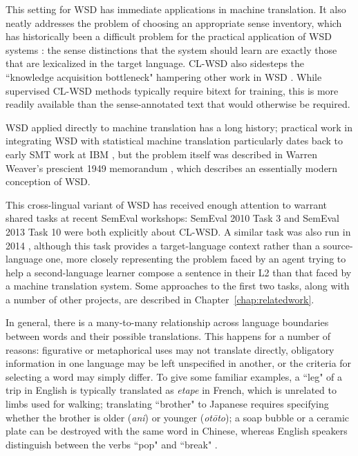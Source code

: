 This setting for WSD has immediate applications in machine translation. It
also neatly addresses the problem of choosing an appropriate sense inventory,
which has historically been a difficult problem for the practical application
of WSD systems \cite{agirre2006word}: the sense distinctions that the system
should learn are exactly those that are lexicalized in the target language.
CL-WSD also sidesteps the ``knowledge acquisition bottleneck" hampering other
work in WSD \cite{lefever-hoste-decock:2011:ACL-HLT2011}.
While supervised CL-WSD methods typically require bitext for training, this is
more readily available than the sense-annotated text that would otherwise be
required.

WSD applied directly to machine translation has a long history; practical work
in integrating WSD with statistical machine translation particularly dates back
to early SMT work at IBM \cite{Brown91word-sensedisambiguation}, but the
problem itself was described in Warren Weaver's prescient 1949 memorandum
\cite{weavermemo}, which describes an essentially modern conception of WSD.

This cross-lingual variant of WSD has received enough attention to warrant
shared tasks at recent SemEval workshops: SemEval 2010 Task 3
\cite{lefever-hoste:2010:SemEval} and SemEval 2013 Task 10 \cite{task10} were both
explicitly about CL-WSD.  A similar task was also run in 2014
\cite{vangompel-EtAl:2014:SemEval}, although this task provides a
target-language context rather than a source-language one, more closely
representing the problem faced by an agent trying to help a second-language
learner compose a sentence in their L2 than that faced by a machine translation
system. Some approaches to the first two tasks, along with a number of other
projects, are described in Chapter~\ref{chap:relatedwork}.

In general, there is a many-to-many relationship across language boundaries
between words and their possible translations.
This happens for a number of reasons: figurative or metaphorical uses may not
translate directly,
obligatory information in one language may be left unspecified in another,
or the criteria for selecting a word may simply differ.
To give some familiar examples, a ``leg" of a trip in English is typically
translated as \emph{etape} in French, which is unrelated to limbs used for
walking;
translating ``brother" to Japanese requires specifying whether the brother is
older (\emph{ani}) or younger (\emph{ot\=oto});
a soap bubble or a ceramic plate can be destroyed with the same word in
Chinese, whereas English speakers distinguish between the verbs
``pop" and ``break" \cite{majid2007semantic}.

